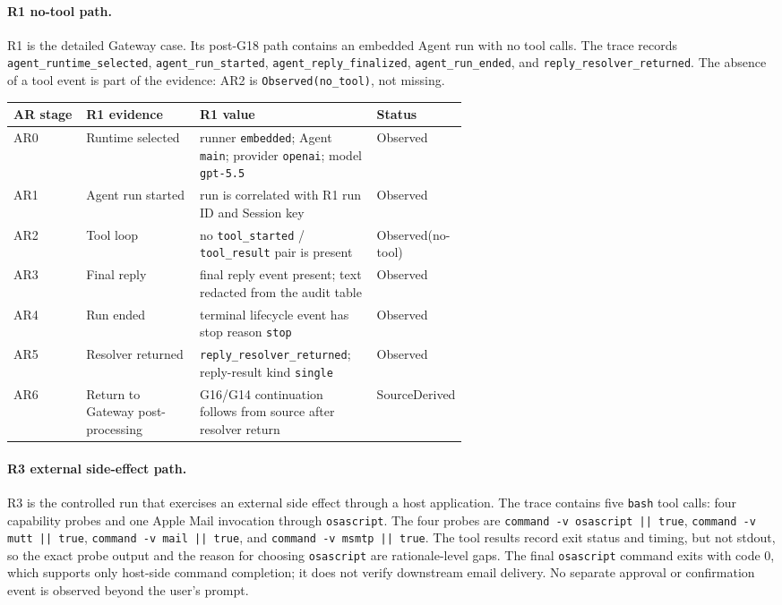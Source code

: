\paragraph{R1 no-tool path.}
R1 is the detailed Gateway case. Its post-G18 path contains an embedded
Agent run with no tool calls. The trace records
\texttt{agent\_runtime\_selected}, \texttt{agent\_run\_started},
\texttt{agent\_reply\_finalized}, \texttt{agent\_run\_ended}, and
\texttt{reply\_resolver\_returned}. The absence of a tool event is part of
the evidence: AR2 is \texttt{Observed(no\_tool)}, not missing.

\begin{tabularx}{\linewidth}{
    @{}
    >{\raggedright\arraybackslash}p{0.16\linewidth}
    >{\raggedright\arraybackslash}p{0.25\linewidth}
    >{\raggedright\arraybackslash}X
    >{\raggedright\arraybackslash}p{0.18\linewidth}
    @{}
}
\toprule
\textbf{AR stage} &
\textbf{R1 evidence} &
\textbf{R1 value} &
\textbf{Status} \\
\midrule
AR0 & Runtime selected & runner \texttt{embedded}; Agent \texttt{main}; provider \texttt{openai}; model \texttt{gpt-5.5} & Observed \\
\addlinespace
AR1 & Agent run started & run is correlated with R1 run ID and Session key & Observed \\
\addlinespace
AR2 & Tool loop & no \texttt{tool\_started} / \texttt{tool\_result} pair is present & Observed(no-tool) \\
\addlinespace
AR3 & Final reply & final reply event present; text redacted from the audit table & Observed \\
\addlinespace
AR4 & Run ended & terminal lifecycle event has stop reason \texttt{stop} & Observed \\
\addlinespace
AR5 & Resolver returned & \texttt{reply\_resolver\_returned}; reply-result kind \texttt{single} & Observed \\
\addlinespace
AR6 & Return to Gateway post-processing & G16/G14 continuation follows from source after resolver return & SourceDerived \\
\bottomrule
\end{tabularx}

\paragraph{R3 external side-effect path.}
R3 is the controlled run that exercises an external side effect through a
host application. The trace contains five \texttt{bash} tool calls: four
capability probes and one Apple Mail invocation through \texttt{osascript}.
The four probes are \texttt{command -v osascript || true},
\texttt{command -v mutt || true}, \texttt{command -v mail || true}, and
\texttt{command -v msmtp || true}. The tool results record exit status and
timing, but not stdout, so the exact probe output and the reason for
choosing \texttt{osascript} are rationale-level gaps. The final
\texttt{osascript} command exits with code 0, which supports only
host-side command completion; it does not verify downstream email
delivery. No separate approval or confirmation event is observed beyond
the user's prompt.

